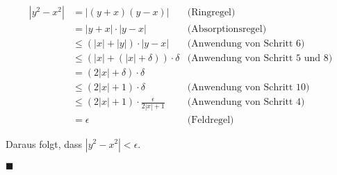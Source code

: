 \documentclass{article}
\begin{document}
\begin{align*}
|y^2 - x^2| &= |(y + x)(y - x)| & \text{(Ringregel)} \\
            &= |y + x| \cdot |y - x| & \text{(Absorptionsregel)} \\
            &\leq (|x| + |y|) \cdot |y - x| & \text{(Anwendung von Schritt 6)} \\
            &\leq (|x| + (|x| + \delta)) \cdot \delta & \text{(Anwendung von Schritt 5 und 8)} \\
            &= (2|x| + \delta) \cdot \delta \\
            &\leq (2|x| + 1) \cdot \delta & \text{(Anwendung von Schritt 10)} \\
            &\leq (2|x| + 1) \cdot \frac{\epsilon}{2|x| + 1} & \text{(Anwendung von Schritt 4)} \\
            &= \epsilon & \text{(Feldregel)}
\end{align*}

Daraus folgt, dass $|y^2 - x^2| < \epsilon$.

\hfill $\blacksquare$
\end{document}
